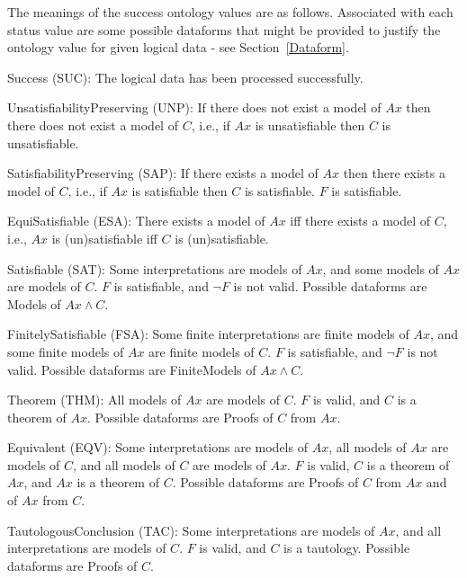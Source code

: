 \documentclass[a4paper]{easychair}
\newenvironment{packed_itemize}{
\vspace*{-0.5em}
\begin{itemize}
  \setlength{\partopsep}{0pt}
  \setlength{\itemsep}{1pt}
  \setlength{\parskip}{0pt}
  \setlength{\parsep}{0pt}
}{\end{itemize}}
\begin{document}
The meanings of the success ontology values are as follows.
Associated with each status value are some possible dataforms that might
be provided to justify the ontology value for given logical data -
see Section~\ref{Dataform}.

\begin{packed_itemize}
\item Success (SUC):
      The logical data has been processed successfully.

\item UnsatisfiabilityPreserving (UNP):
      If there does not exist a model of $Ax$ then there does not exist a
      model of $C$, i.e., if $Ax$ is unsatisfiable then $C$ is unsatisfiable.

\item SatisfiabilityPreserving (SAP):
      If there exists a model of $Ax$ then there exists a model of $C$, i.e.,
      if $Ax$ is satisfiable then $C$ is satisfiable.
      $F$ is satisfiable.

\item EquiSatisfiable (ESA):
      There exists a model of $Ax$ iff there exists a model of $C$, i.e.,
      $Ax$ is (un)satisfiable iff $C$ is (un)satisfiable.

\item Satisfiable (SAT):
      Some interpretations are models of $Ax$, and
      some models of $Ax$ are models of $C$.
      $F$ is satisfiable, and $\neg F$ is not valid.
      Possible dataforms are Models of $Ax \wedge C$.

\item FinitelySatisfiable (FSA):
      Some finite interpretations are finite models of $Ax$, and
      some finite models of $Ax$ are finite models of $C$.
      $F$ is satisfiable, and $\neg F$ is not valid.
      Possible dataforms are FiniteModels of $Ax \wedge C$.

\item Theorem (THM):
      All models of $Ax$ are models of $C$.
      $F$ is valid, and $C$ is a theorem of $Ax$.
      Possible dataforms are Proofs of $C$ from $Ax$.

\item Equivalent (EQV):
      Some interpretations are models of $Ax$,
      all models of $Ax$ are models of $C$, and
      all models of $C$ are models of $Ax$.
      $F$ is valid, $C$ is a theorem of $Ax$, and $Ax$ is a theorem of $C$.
      Possible dataforms are Proofs of $C$ from $Ax$ and of $Ax$ from $C$.

\item TautologousConclusion (TAC):
      Some interpretations are models of $Ax$, and
      all interpretations are models of $C$.
      $F$ is valid, and $C$ is a tautology.
      Possible dataforms are Proofs of $C$.


\end{packed_itemize}
\end{document}

